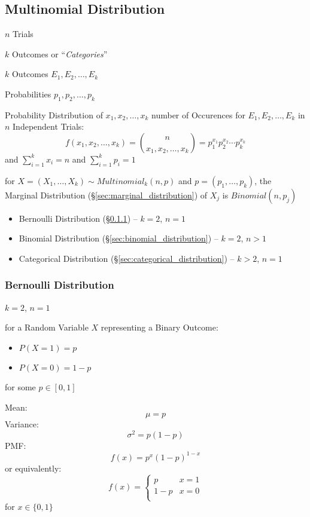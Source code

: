 \subsection{Multinomial Distribution}\label{sec:multinomial_distribution}

$n$ Trials

$k$ Outcomes or ``\emph{Categories}''

$k$ Outcomes $E_1, E_2, \ldots, E_k$

Probabilities $p_1, p_2, \ldots, p_k$

Probability Distribution of $x_1, x_2, \ldots, x_k$ number of
Occurences for $E_1, E_2, \ldots, E_k$ in $n$ Independent Trials:
\[
  f(x_1, x_2, \ldots, x_k) = \binom{n}{x_1, x_2, \ldots, x_k} =
    p_1^{x_1} p_2^{x_2} \cdots p_k^{x_k}
\]
and $\sum_{i=1}^k x_i = n$ and $\sum_{i=1}^k {p_i} = 1$

for $X = (X_1, \ldots, X_k) \sim Multinomial_k(n, p)$ and
$p = (p_1, \ldots, p_k)$, the Marginal Distribution
(\S\ref{sec:marginal_distribution}) of $X_j$ is $Binomial (n, p_j)$

\begin{itemize}
  \item Bernoulli Distribution (\S\ref{sec:bernoulli_distribution}) -- $k = 2$,
    $n = 1$
  \item Binomial Distribution (\S\ref{sec:binomial_distribution}) -- $k = 2$,
    $n > 1$
  \item Categorical Distribution (\S\ref{sec:categorical_distribution}) --
    $k > 2$, $n = 1$
\end{itemize}



\subsubsection{Bernoulli Distribution}\label{sec:bernoulli_distribution}

$k = 2$, $n = 1$

for a Random Variable $X$ representing a Binary Outcome:
\begin{itemize}
  \item $P(X=1) = p$
  \item $P(X=0) = 1-p$
\end{itemize}
for some $p \in [0,1]$

Mean:
\[
  \mu = p
\]
Variance:
\[
  \sigma^2 = p(1-p)
\]
PMF:
\[
  f(x) = p^x(1-p)^{1-x}
\]
or equivalently:
\[
  f(x) = \begin{cases}
    p   & x = 1 \\
    1-p & x = 0 \\
  \end{cases}
\]
for $x \in \{0, 1\}$

